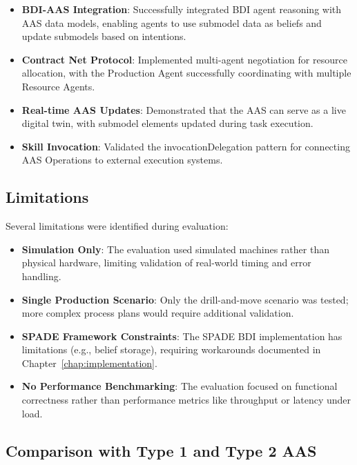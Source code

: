 \begin{itemize}
    \item \textbf{BDI-AAS Integration}: Successfully integrated BDI agent reasoning with \ac{AAS} data models, enabling agents to use submodel data as beliefs and update submodels based on intentions.
    
    \item \textbf{Contract Net Protocol}: Implemented multi-agent negotiation for resource allocation, with the Production Agent successfully coordinating with multiple Resource Agents.
    
    \item \textbf{Real-time AAS Updates}: Demonstrated that the \ac{AAS} can serve as a live digital twin, with submodel elements updated during task execution.
    
    \item \textbf{Skill Invocation}: Validated the invocationDelegation pattern for connecting \ac{AAS} Operations to external execution systems.
\end{itemize}

\subsection{Limitations}

Several limitations were identified during evaluation:

\begin{itemize}
    \item \textbf{Simulation Only}: The evaluation used simulated machines rather than physical hardware, limiting validation of real-world timing and error handling.
    
    \item \textbf{Single Production Scenario}: Only the drill-and-move scenario was tested; more complex process plans would require additional validation.
    
    \item \textbf{SPADE Framework Constraints}: The SPADE BDI implementation has limitations (e.g., belief storage), requiring workarounds documented in Chapter~\ref{chap:implementation}.
    
    \item \textbf{No Performance Benchmarking}: The evaluation focused on functional correctness rather than performance metrics like throughput or latency under load.
\end{itemize}

\subsection{Comparison with Type 1 and Type 2 AAS}

